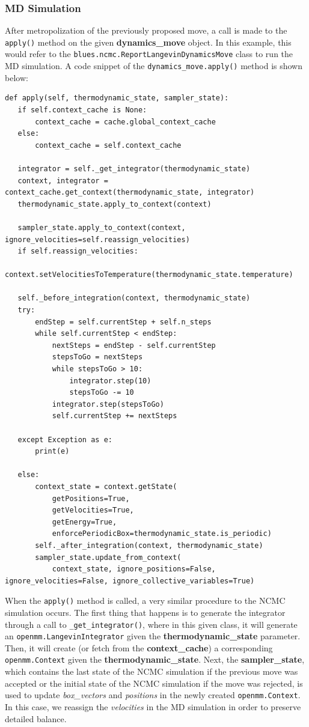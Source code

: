 \subsubsection{MD Simulation}
After metropolization of the previously proposed move, a call is made to the \texttt{apply()} method on the given \textbf{dynamics\_move} object.
In this example, this would refer to the \texttt{blues.ncmc.ReportLangevinDynamicsMove} class to run the MD simulation.
A code snippet of the \texttt{dynamics_move.apply()} method is shown below:

\begin{verbatim}
def apply(self, thermodynamic_state, sampler_state):
   if self.context_cache is None:
       context_cache = cache.global_context_cache
   else:
       context_cache = self.context_cache

   integrator = self._get_integrator(thermodynamic_state)
   context, integrator = context_cache.get_context(thermodynamic_state, integrator)
   thermodynamic_state.apply_to_context(context)

   sampler_state.apply_to_context(context, ignore_velocities=self.reassign_velocities)
   if self.reassign_velocities:
       context.setVelocitiesToTemperature(thermodynamic_state.temperature)

   self._before_integration(context, thermodynamic_state)
   try:
       endStep = self.currentStep + self.n_steps
       while self.currentStep < endStep:
           nextSteps = endStep - self.currentStep
           stepsToGo = nextSteps
           while stepsToGo > 10:
               integrator.step(10)
               stepsToGo -= 10
           integrator.step(stepsToGo)
           self.currentStep += nextSteps

   except Exception as e:
       print(e)

   else:
       context_state = context.getState(
           getPositions=True,
           getVelocities=True,
           getEnergy=True,
           enforcePeriodicBox=thermodynamic_state.is_periodic)
       self._after_integration(context, thermodynamic_state)
       sampler_state.update_from_context(
           context_state, ignore_positions=False, ignore_velocities=False, ignore_collective_variables=True)

\end{verbatim}

When the \texttt{apply()} method is called, a very similar procedure to the NCMC simulation occurs. 
The first thing that happens is to generate the integrator through a call to \texttt{_get_integrator()}, where in this given class, it will generate an \texttt{openmm.LangevinIntegrator} given the \textbf{thermodynamic\_state} parameter.
Then, it will create (or fetch from the \textbf{context\_cache}) a corresponding \texttt{openmm.Context} given the \textbf{thermodynamic\_state}.
Next, the \textbf{sampler\_state}, which contains the last state of the NCMC simulation if the previous move was accepted or the initial state of the NCMC simulation if the move was rejected, is used to update \emph{box\_vectors} and \emph{positions} in the newly created \texttt{openmm.Context}. 
In this case, we reassign the \emph{velocities} in the MD simulation in order to preserve detailed balance.

